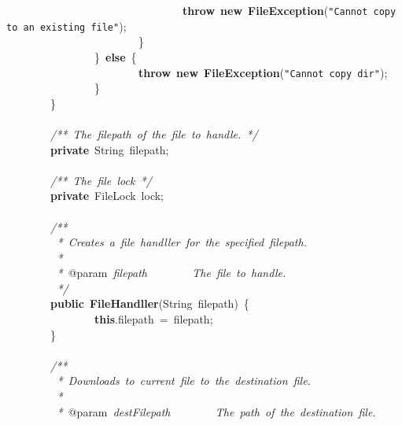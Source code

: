 \mbox{}\ \ \ \ \ \ \ \ \ \ \ \ \ \ \ \ \ \ \ \ \ \ \ \ \ \ \ \ \ \ \ \ \textbf{throw}\ \textbf{new}\ \textbf{FileException}(\texttt{"{}Cannot\ copy\ to\ an\ existing\ file"{}}); \\
\mbox{}\ \ \ \ \ \ \ \ \ \ \ \ \ \ \ \ \ \ \ \ \ \ \ \ \} \\
\mbox{}\ \ \ \ \ \ \ \ \ \ \ \ \ \ \ \ \}\ \textbf{else}\ \{ \\
\mbox{}\ \ \ \ \ \ \ \ \ \ \ \ \ \ \ \ \ \ \ \ \ \ \ \ \textbf{throw}\ \textbf{new}\ \textbf{FileException}(\texttt{"{}Cannot\ copy\ dir"{}}); \\
\mbox{}\ \ \ \ \ \ \ \ \ \ \ \ \ \ \ \ \} \\
\mbox{}\ \ \ \ \ \ \ \ \} \\
\mbox{} \\
\mbox{}\ \ \ \ \ \ \ \ \textit{/**\ The\ filepath\ of\ the\ file\ to\ handle.\ */} \\
\mbox{}\ \ \ \ \ \ \ \ \textbf{private}\ String\ filepath; \\
\mbox{}\ \ \ \ \ \ \ \  \\
\mbox{}\ \ \ \ \ \ \ \ \textit{/**\ The\ file\ lock\ */} \\
\mbox{}\ \ \ \ \ \ \ \ \textbf{private}\ FileLock\ lock; \\
\mbox{} \\
\mbox{}\ \ \ \ \ \ \ \ \textit{/**} \\
\mbox{}\textit{\ \ \ \ \ \ \ \ \ *\ Creates\ a\ file\ handller\ for\ the\ specified\ filepath.} \\
\mbox{}\textit{\ \ \ \ \ \ \ \ \ *} \\
\mbox{}\textit{\ \ \ \ \ \ \ \ \ *\ }@param\textit{\ filepath\ \ \ \ \ \ \ \ The\ file\ to\ handle.} \\
\mbox{}\textit{\ \ \ \ \ \ \ \ \ */} \\
\mbox{}\ \ \ \ \ \ \ \ \textbf{public}\ \textbf{FileHandller}(String\ filepath)\ \{ \\
\mbox{}\ \ \ \ \ \ \ \ \ \ \ \ \ \ \ \ \textbf{this}.filepath\ =\ filepath; \\
\mbox{}\ \ \ \ \ \ \ \ \} \\
\mbox{} \\
\mbox{}\ \ \ \ \ \ \ \ \textit{/**} \\
\mbox{}\textit{\ \ \ \ \ \ \ \ \ *\ Downloads\ to\ current\ file\ to\ the\ destination\ file.} \\
\mbox{}\textit{\ \ \ \ \ \ \ \ \ *} \\
\mbox{}\textit{\ \ \ \ \ \ \ \ \ *\ }@param\textit{\ destFilepath\ \ \ \ \ \ \ \ The\ path\ of\ the\ destination\ file.} \\

